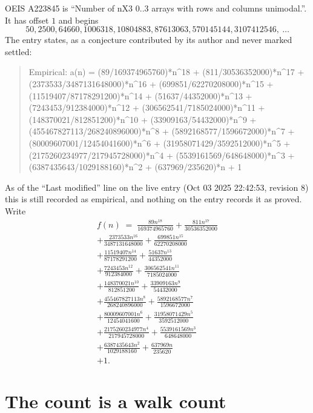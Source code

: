 \documentclass[11pt,a4paper]{article}
\theoremstyle{plain}
\theoremstyle{definition}
\begin{document}
OEIS A223845 is ``Number of nX3 0..3 arrays with rows and columns unimodal.''. It has offset $1$ and begins
\[
50, 2500, 64660, 1006318, 10804883, 87613063, 570145144, 3107412546,\ \dots
\]
The entry states, as a conjecture contributed by its author and never marked settled:
\begin{quote}\raggedright\small
Empirical: a(n) = (89/169374965760)*n\^{}18 + (811/30536352000)*n\^{}17 + (2373533/3487131648000)*n\^{}16 + (699851/62270208000)*n\^{}15 + (11519407/87178291200)*n\^{}14 + (51637/44352000)*n\^{}13 + (7243453/912384000)*n\^{}12 + (306562541/7185024000)*n\^{}11 + (148370021/812851200)*n\^{}10 + (33909163/54432000)*n\^{}9 + (455467827113/268240896000)*n\^{}8 + (5892168577/1596672000)*n\^{}7 + (80009607001/12454041600)*n\^{}6 + (31958071429/3592512000)*n\^{}5 + (2175260234977/217945728000)*n\^{}4 + (5539161569/648648000)*n\^{}3 + (6387435643/1029188160)*n\^{}2 + (637969/235620)*n + 1
\end{quote}
As of the ``Last modified'' line on the live entry (Oct 03 2025 22:42:53, revision 8) this is still
recorded as empirical, and nothing on the entry records it as proved. Write
\begin{multline*}
f(n)\;=\;\frac{89 n^{18}}{169374965760} + \frac{811 n^{17}}{30536352000} \\
+ \frac{2373533 n^{16}}{3487131648000} + \frac{699851 n^{15}}{62270208000} \\
+ \frac{11519407 n^{14}}{87178291200} + \frac{51637 n^{13}}{44352000} \\
+ \frac{7243453 n^{12}}{912384000} + \frac{306562541 n^{11}}{7185024000} \\
+ \frac{148370021 n^{10}}{812851200} + \frac{33909163 n^{9}}{54432000} \\
+ \frac{455467827113 n^{8}}{268240896000} + \frac{5892168577 n^{7}}{1596672000} \\
+ \frac{80009607001 n^{6}}{12454041600} + \frac{31958071429 n^{5}}{3592512000} \\
+ \frac{2175260234977 n^{4}}{217945728000} + \frac{5539161569 n^{3}}{648648000} \\
+ \frac{6387435643 n^{2}}{1029188160} + \frac{637969 n}{235620} \\
+ 1.
\end{multline*}

\section{The count is a walk count}
\end{document}

